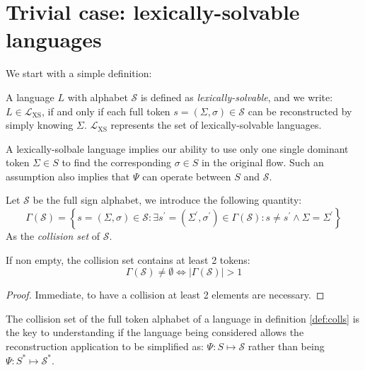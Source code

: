 
\section{Trivial case: lexically-solvable languages}
\label{sec:lexs}

We start with a simple definition:

\begin{definition} \label{def:lexsolv}
A language $L$ with alphabet $\mathcal{S}$ is defined as \textit{lexically-solvable},
and we write: $L \in \mathcal{L}_{\text{XS}}$, if
and only if each full
token $s = (\Sigma, \sigma) \in \mathcal{S}$ can be reconstructed by simply knowing $\Sigma$.
$\mathcal{L}_{\text{XS}}$ represents the set of lexically-solvable languages.
\end{definition}

A lexically-solbale language implies our
ability to use only one single dominant token $\Sigma \in S$ to find the corresponding $\sigma \in S$
in the original flow. Such an assumption also implies that $\Psi$ can operate
between $S$ and $\mathcal{S}$.

\begin{definition} \label{def:colls}
Let $\mathcal{S}$ be the full sign alphabet, we introduce the following quantity:
\begin{equation*}
\Gamma(\mathcal{S}) = \left\{ s = (\Sigma, \sigma) \in \mathcal{S} : 
\exists s^\prime = (\Sigma^\prime, \sigma^\prime) \in \Gamma(\mathcal{S}) : 
s \neq s^\prime \wedge \Sigma = \Sigma^\prime \right\} 
\end{equation*}
As the \textit{collision set} of $\mathcal{S}$.
\end{definition}

\begin{lemma}
If non empty, the collision set contains at least 2 tokens:
\begin{equation*}
\Gamma(\mathcal{S}) \neq \emptyset \iff \left| \Gamma(\mathcal{S}) \right| > 1
\end{equation*}
\begin{proof}
Immediate, to have a collision at least 2 elements are necessary.
\end{proof}
\end{lemma}

The collision set of the full token alphabet of a language in definition \ref{def:colls} is the key to
understanding if the language being considered allows the reconstruction application to be simplified as:
$\Psi : S \mapsto \mathcal{S}$ rather than being $\Psi : S^\ast \mapsto \mathcal{S}^\ast$.

